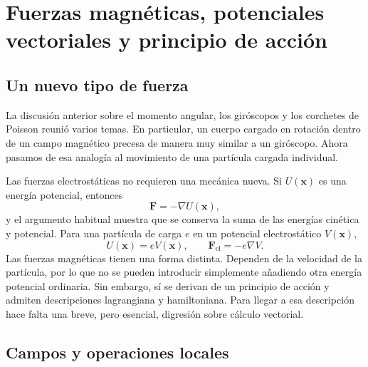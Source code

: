 \chapter{Fuerzas magnéticas, potenciales vectoriales y principio de acción}


\section{Un nuevo tipo de fuerza}

La discusión anterior sobre el momento angular, los giróscopos y los corchetes de Poisson reunió varios temas. En particular, un cuerpo cargado en rotación dentro de un campo magnético precesa de manera muy similar a un giróscopo. Ahora pasamos de esa analogía al movimiento de una partícula cargada individual.

Las fuerzas electrostáticas no requieren una mecánica nueva. Si \(U(\mathbf x)\) es una energía potencial, entonces
\begin{equation}
  \mathbf F=-\nabla U(\mathbf x),
\end{equation}
y el argumento habitual muestra que se conserva la suma de las energías cinética y potencial. Para una partícula de carga \(e\) en un potencial electrostático \(V(\mathbf x)\),
\begin{equation}
  U(\mathbf x)=eV(\mathbf x),
  \qquad
  \mathbf F_{\mathrm{el}}=-e\nabla V.
\end{equation}
Las fuerzas magnéticas tienen una forma distinta. Dependen de la velocidad de la partícula, por lo que no se pueden introducir simplemente añadiendo otra energía potencial ordinaria. Sin embargo, sí se derivan de un principio de acción y admiten descripciones lagrangiana y hamiltoniana. Para llegar a esa descripción hace falta una breve, pero esencial, digresión sobre cálculo vectorial.

\section{Campos y operaciones locales}

